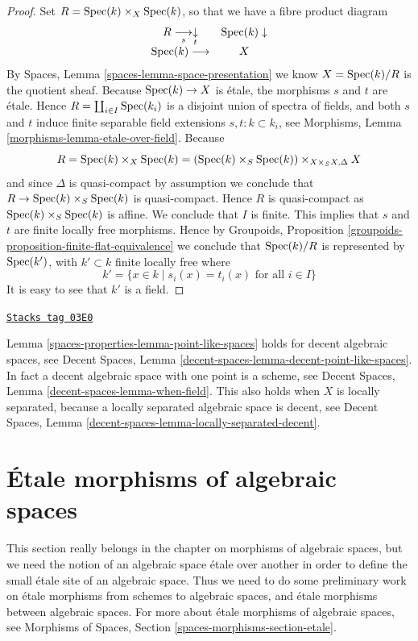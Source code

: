 \begin{proof}
Set $R = \operatorname{Spec}(k) \times_X \operatorname{Spec}(k)$, so that we have a
fibre product diagram
$$
\begin{array}{cc}R \underset{s}{\longrightarrow}\underset{t}{\downarrow} & \operatorname{Spec}(k) \downarrow \\ \operatorname{Spec}(k) \longrightarrow & X\end{array}
$$
By
Spaces, Lemma \ref{spaces-lemma-space-presentation}
we know $X = \operatorname{Spec}(k)/R$ is the quotient sheaf.
Because $\operatorname{Spec}(k) \to X$ is \'etale, the morphisms $s$ and $t$ are
\'etale. Hence $R = \coprod_{i \in I} \operatorname{Spec}(k_i)$ is a disjoint
union of spectra of fields, and both $s$ and $t$
induce finite separable field extensions $s, t : k \subset k_i$, see
Morphisms, Lemma \ref{morphisms-lemma-etale-over-field}.
Because
$$
R = \operatorname{Spec}(k) \times_X \operatorname{Spec}(k)
= (\operatorname{Spec}(k) \times_S \operatorname{Spec}(k)) \times_{X \times_S X, \Delta} X
$$
and since $\Delta$ is quasi-compact by assumption we conclude that
$R \to \operatorname{Spec}(k) \times_S \operatorname{Spec}(k)$ is quasi-compact.
Hence $R$ is quasi-compact as $\operatorname{Spec}(k) \times_S \operatorname{Spec}(k)$ is
affine. We conclude that $I$ is finite. This implies
that $s$ and $t$ are finite locally free morphisms. Hence by
Groupoids, Proposition \ref{groupoids-proposition-finite-flat-equivalence}
we conclude that $\operatorname{Spec}(k)/R$ is
represented by $\operatorname{Spec}(k')$, with $k' \subset k$ finite locally free
where
$$
k' = \{x \in k \mid s_i(x) = t_i(x)\text{ for all }i \in I\}
$$
It is easy to see that $k'$ is a field.
\end{proof}

\begin{remark}
\label{spaces-properties-remark-cannot-decide-yet}
\href{https://stacks.math.columbia.edu/tag/03E0}{\texttt{Stacks tag 03E0}}

Lemma \ref{spaces-properties-lemma-point-like-spaces} holds for decent algebraic spaces, see
Decent Spaces, Lemma \ref{decent-spaces-lemma-decent-point-like-spaces}.
In fact a decent algebraic space with one point is a scheme, see
Decent Spaces, Lemma \ref{decent-spaces-lemma-when-field}.
This also holds when $X$ is locally separated, because a
locally separated algebraic space is decent, see
Decent Spaces, Lemma \ref{decent-spaces-lemma-locally-separated-decent}.
\end{remark}

\section{\'Etale morphisms of algebraic spaces}
\label{spaces-properties-section-etale-morphisms}
This section really belongs in the chapter on morphisms of algebraic
spaces, but we need the notion of an algebraic space \'etale over another
in order to define the small \'etale site of an algebraic space.
Thus we need to do some preliminary work on \'etale morphisms from schemes to
algebraic spaces, and \'etale morphisms between algebraic spaces.
For more about \'etale morphisms of algebraic spaces, see
Morphisms of Spaces, Section \ref{spaces-morphisms-section-etale}.

